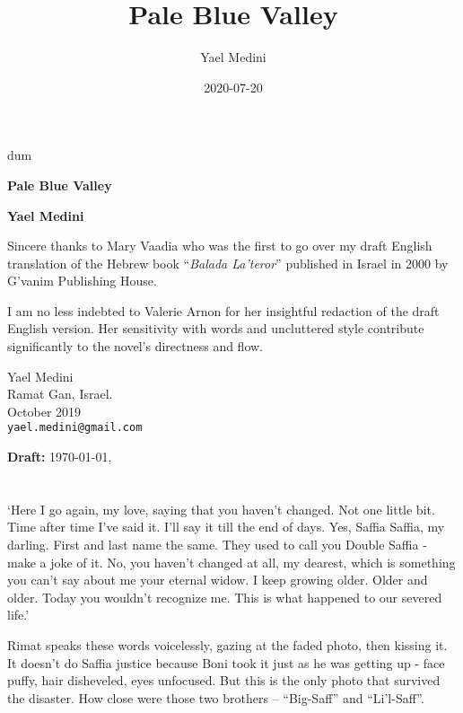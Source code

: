 \documentclass[twoside,11pt]{book}
\title{Pale Blue Valley}
\author{Yael Medini}
\date{2020-07-20}
\begin{document}
\thispagestyle{empty}
{\nullfont dum}
\vspace{.3\textheight}
\begin{center}
{\Huge \textbf{Pale Blue Valley}}

\bigskip

\textbf{\Large Yael Medini}
\end{center}
\vspace{.2\textheight}

Sincere thanks to Mary Vaadia who was the first to go over my draft
English translation of the Hebrew book ``\emph{Balada La'teror}''
published in Israel in 2000 by G'vanim Publishing House.

\bigskip
I am no less indebted to Valerie Arnon for her insightful redaction of the
draft English version. Her sensitivity with words and uncluttered style
contribute significantly to the novel's directness and flow.

\bigskip
{
\parindent=0pt
Yael Medini\\
Ramat Gan, Israel. \\
October 2019 \\
\texttt{yael.medini@gmail.com}
}

\ifdefined\ymdhms
 \bigskip
 \textbf{Draft:}  \today, \currenttime
\fi

\chapter{}

`Here I go again, my love, saying that you haven't changed. Not one
little bit. Time after time I've said it. I'll say it till the end of
days. Yes, Saffia Saffia, my darling. First and last name the
same. They used to call you Double Saffia - make a joke of it. No, you
haven't changed at all, my dearest, which is something you can't say
about me your eternal widow. I keep growing older. Older and older.
Today you wouldn't recognize me. This is what happened to our
severed life.'

Rimat speaks these words voicelessly, gazing at the faded photo, then kissing it.
It doesn't do Saffia
justice because Boni took it just as he was getting up - face
puffy, hair disheveled,
eyes unfocused. But this is the only photo that survived the
disaster. How close were those two brothers -- ``Big-Saff'' and
``Li'l-Saff''.
\end{document}

